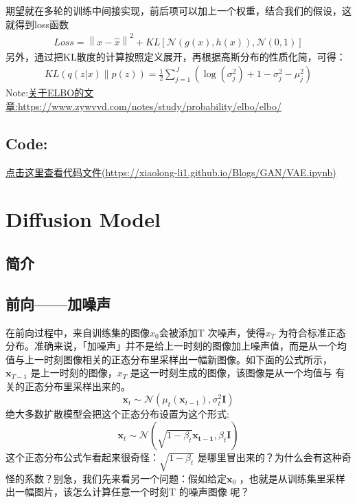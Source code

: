 \documentclass[]{report}
\begin{document}
\FloatBarrier
期望就在多轮的训练中间接实现，前后项可以加上一个权重，结合我们的假设，这就得到loss函数
\begin{align}
	Loss = \left\|x - \hat{x}\right\|^{2} + KL\left[\mathcal{N}(g(x), h(x)), \mathcal{N}(0, 1)\right]
\end{align}
另外，通过把KL散度的计算按照定义展开，再根据高斯分布的性质化简，可得：
\begin{align}
	KL(q(z|x) \parallel p(z)) = \frac{1}{2} \sum_{j=1}^{J} \left( \log(\sigma_j^2) + 1 - \sigma_j^2 - \mu_j^2 \right)
\end{align}
Note:\href{https://www.zywvvd.com/notes/study/probability/elbo/elbo/}{关于ELBO的文章:https://www.zywvvd.com/notes/study/probability/elbo/elbo/}
\section{Code:}
\href{./VAE.ipynb}{点击这里查看代码文件(https://xiaolong-li1.github.io/Blogs/GAN/VAE.ipynb)}
\chapter{Diffusion Model}
\section{简介}
\section{前向——加噪声}
在前向过程中，来自训练集的图像$x_0$会被添加T
次噪声，使得$x_T$
为符合标准正态分布。准确来说，「加噪声」并不是给上一时刻的图像加上噪声值，而是从一个均值与上一时刻图像相关的正态分布里采样出一幅新图像。如下面的公式所示，$\mathbf{x}_{T-1}$
是上一时刻的图像，$x_T$
是这一时刻生成的图像，该图像是从一个均值与
有关的正态分布里采样出来的。\\
\[
\mathbf{x}_t \sim \mathcal{N}(\mu_t(\mathbf{x}_{t-1}), \sigma_t^2 \mathbf{I})
\]
绝大多数扩散模型会把这个正态分布设置为这个形式:
\[
\mathbf{x}_t \sim \mathcal{N}(\sqrt{1-\beta_t}\mathbf{x_{t-1}},\beta_t \mathbf{I})
\]
\indent 这个正态分布公式乍看起来很奇怪：$\sqrt{1-\beta_t}$
是哪里冒出来的？为什么会有这种奇怪的系数？别急，我们先来看另一个问题：假如给定$\mathbf{x}_{0}$
，也就是从训练集里采样出一幅图片，该怎么计算任意一个时刻T
的噪声图像
呢？
\end{document}
